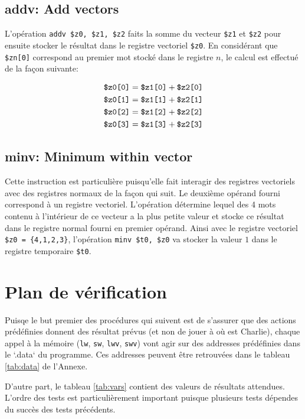 \documentclass[a11paper]{article}
\newcommand{\vtt}[1]{%
  \text{\normalfont\ttfamily\detokenize{#1}}%
}
\begin{document}
\subsection{addv: Add vectors}

L'opération \verb|addv $z0, $z1, $z2| faits la somme du vecteur \verb|$z1| et
\verb|$z2| pour ensuite stocker le résultat dans le registre vectoriel
\verb|$z0|. En considérant que \verb|$zn[0]| correspond au premier mot stocké
dans le registre $n$, le calcul est effectué de la façon suivante:

\begin{align}
  \vtt{$z0[0]} &= \vtt{$z1[0]} + \vtt{$z2[0]} \\
  \vtt{$z0[1]} &= \vtt{$z1[1]} + \vtt{$z2[1]} \\
  \vtt{$z0[2]} &= \vtt{$z1[2]} + \vtt{$z2[2]} \\
  \vtt{$z0[3]} &= \vtt{$z1[3]} + \vtt{$z2[3]}
\end{align}

\subsection{minv: Minimum within vector}

Cette instruction est particulière puisqu'elle fait interagir des registres
vectoriels avec des registres normaux de la façon qui suit. Le deuxième opérand
fourni correspond à un registre vectoriel. L'opération détermine lequel des 4
mots contenu à l'intérieur de ce vecteur a la plus petite valeur et stocke ce
résultat dans le registre normal fourni en premier opérand. Ainsi avec le
registre vectoriel \verb|$z0 = {4,1,2,3}|, l'opération \verb|minv $t0, $z0| va
stocker la valeur $1$ dans le registre temporaire \verb|$t0|.

\section{Plan de vérification}

Puisqe le but premier des procédures qui suivent est de s'assurer que des
actions prédéfinies donnent des résultat prévus (et non de jouer à où est
Charlie), chaque appel à la mémoire (\verb|lw|, \verb|sw|, \verb|lwv|,
\verb|swv|) vont agir sur des addresses prédéfinies dans le `.data` du
programme. Ces addresses peuvent être retrouvées dans le tableau \ref{tab:data}
de l'Annexe.

D'autre part, le tableau \ref{tab:vars} contient des valeurs de résultats
attendues.
L'ordre des tests est particulièrement important puisque plusieurs tests
dépendes du succès des tests précédents.
\end{document}

